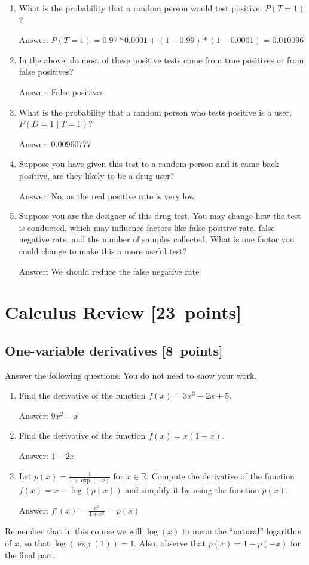 \documentclass{article}
\newcommand{\blu}[1]{{\textcolor{blu}{#1}}}
\newcommand{\gre}[1]{\textcolor{gre}{#1}}
\newcommand\ans[1]{\par\gre{Answer: #1}}
\newenvironment{answer}{\par\begingroup\color{gre}Answer: }{\endgroup}
\let\ask\blu
\newcommand\pts[1]{\textcolor{pointscolour}{[#1~points]}}
\def\R{\mathbb{R}}
\begin{document}
  \begin{enumerate}
  \item What is the probability that a random person would test positive, $P(T=1)$?
  \begin{answer}
  $P(T=1) = 0.97 * 0.0001 + (1 - 0.99) * (1- 0.0001) = 0.010096$
  \end{answer}
  
  \item In the above, do most of these positive tests come from true positives or from false positives?
  \begin{answer}
  False positives
  \end{answer}
  \item What is the probability that a random person who tests positive is a user, $P(D=1 \mid T=1)$?
  \ans{0.00960777}
  \item Suppose you have given this test to a random person and it came back positive, are they likely to be a drug user?
  \ans{No, as the real positive rate is very low}
  \item Suppose you are the designer of this drug test. You may change how the test is conducted, which may influence factors like false positive rate, false negative rate, and the number of samples collected. What is one factor you could change to make this a more useful test?
  \ans{We should reduce the false negative rate}
  \end{enumerate}


  \clearpage\section{Calculus Review \pts{23}}



  \subsection{One-variable derivatives \pts{8}}
  \label{sub.one.var}

  \ask{Answer the following questions.} You do not need to show your work.

  \begin{enumerate}
  \item Find the derivative of the function $f(x) = 3x^3 -2x + 5$.
  \begin{answer}
  $9x^2-x$
  \end{answer}
  \item Find the derivative of the function $f(x) = x(1-x)$.
  \begin{answer}
  $1-2x$
  \end{answer}
  
  \item Let $p(x) = \frac{1}{1+\exp(-x)}$ for $x \in \R$. Compute the derivative of the function $f(x) = x-\log(p(x))$ and simplify it by using the function $p(x)$.
  \begin{answer}
  $f'(x) = \frac{e^x}{1+e^x} = p(x)$
  \end{answer}
  \end{enumerate}
  Remember that in this course we will $\log(x)$ to mean the ``natural'' logarithm of $x$, so that $\log(\exp(1)) = 1$. Also, observe that $p(x) = 1-p(-x)$ for the final part.
\end{document}
